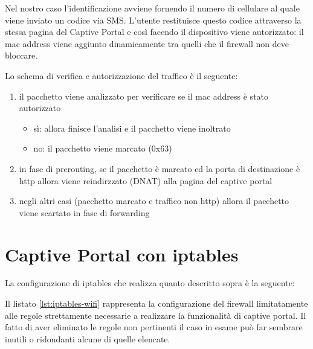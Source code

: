 Nel nostro caso l'identificazione avviene fornendo il numero di cellulare al
quale viene inviato un codice via SMS. L'utente restituisce questo codice
attraverso la stessa pagina del Captive Portal e cos\`i facendo il dispositivo
viene autorizzato: il mac address viene aggiunto dinamicamente tra quelli
che il firewall non deve bloccare.

Lo schema di verifica e autorizzazione del traffico è il seguente:
\begin{enumerate}
    \item il pacchetto viene analizzato per verificare se il mac
    address è stato autorizzato
    \begin{itemize}
        \item sì: allora finisce l'analisi e il pacchetto viene inoltrato
        \item no: il pacchetto viene marcato (0x63)
    \end{itemize}
    \item in fase di prerouting, se il pacchetto è marcato ed la porta di
    destinazione è http allora viene reindirzzato (DNAT) alla pagina del
    captive portal
    \item negli altri casi (pacchetto marcato e traffico non http) allora il
    pacchetto viene scartato in fase di forwarding
\end{enumerate}

\section{Captive Portal con iptables}
La configurazione di iptables che realizza quanto descritto sopra è la
seguente:

Il listato \ref{lst:iptables-wifi} rappresenta la configurazione del
firewall limitatamente alle regole strettamente necessarie a realizzare la
funzionalità di captive portal. Il fatto di aver eliminato le regole non
pertinenti il caso in esame può far sembrare inutili o ridondanti alcune di
quelle elencate.

